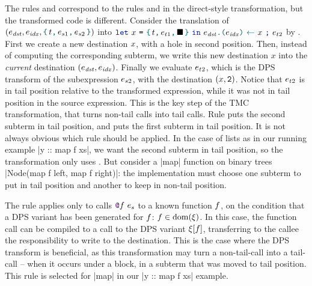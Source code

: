 The rules  and 
correspond to the rules  and  in the direct-style transformation, but the transformed code is different. Consider the translation of $
\left(
  \datalangExpr_\mathit{dst},
  \datalangExpr_\mathit{idx},
  \datalangBlock{\datalangTag}{\datalangExpr_{s1}}{\datalangExpr_{s2}}
\right)
$ into $
\datalangLet{\datalangVar}{\datalangBlock{\datalangTag}{\datalangExpr_{t1}}{\datalangHole}}{
  \datalangSeq{\datalangStore{\datalangExpr_\mathit{dst}}{\datalangExpr_\mathit{idx}}{\datalangVar}}{\datalangExpr_{t2}}}
$ by . First we create a new destination $\datalangVar$, with a hole in second position. Then, instead of computing the corresponding subterm, we write this new destination $x$ into the \emph{current} destination $({\datalangExpr_\mathit{dst}}, {\datalangExpr_\mathit{idx}})$. Finally we evaluate $\datalangExpr_{t2}$, which is the DPS transform of the subexpression $\datalangExpr_{s2}$, with the destination $(\datalangVar, \datalangTwo)$. Notice that $\datalangExpr_{t2}$ is in tail position relative to the transformed expression, while it was not in tail position in the source expression. This is the key step of the TMC transformation, that turns non-tail calls into tail calls. Rule  puts the second subterm in tail position, and  puts the first subterm in tail position. It is not always obvious which rule should be applied. In the case of lists as in our running example \ocaml|y :: map f xs|, we want the second subterm in tail position, so the transformation only uses . But consider a \ocaml|map| function on binary trees \ocaml|Node(map f left, map f right)|: the implementation must choose one subterm to put in tail position and another to keep in non-tail position.

The rule  applies only to calls $\datalangCall {\datalangFnptr \datalangFn} {\datalangExpr_s}$ to a known function $\datalangFn$, on the condition that a DPS variant has been generated for $\datalangFn$: $\datalangFn \in \dom{\datalangRenaming}$. In this case, the function call can be compiled to a call to the DPS variant $\datalangRenaming [\datalangFn]$, transferring to the callee the responsibility to write to the destination. This is the case where the DPS transform is beneficial, as this transformation may turn a non-tail-call into a tail-call -- when it occurs under a block, in a subterm that was moved to tail position. This rule is selected for \ocaml|map| in our \ocaml|y :: map f xs| example.

